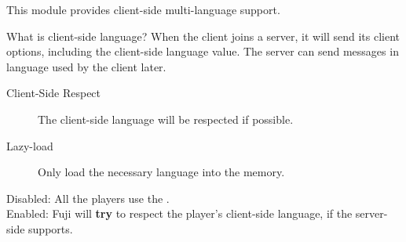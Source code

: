 \label{sec:language}
This module provides client-side multi-language support.


\begin{note}{What is client-side language?}
    When the client joins a server, it will send its client options, including the client-side language value.
    The server can send messages in language used by the client later.
\end{note}


\begin{description}
    \item[Client-Side Respect] The client-side language will be respected if possible.
    \item[Lazy-load] Only load the necessary language into the memory.
\end{description}


Disabled: All the players use the .\\
Enabled: Fuji will \textbf{try} to respect the player's client-side language, if the server-side supports.
